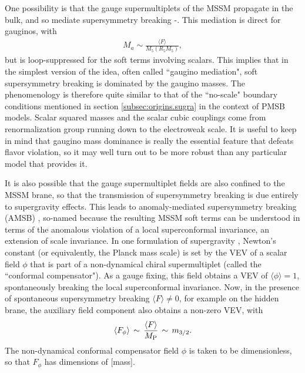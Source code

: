 \documentclass[11pt]{article}
\def\beq{\begin{eqnarray}}
\def\eeq{\end{eqnarray}}
\def\MPlanck{M_{\rm P}}
\begin{document}
One possibility is that the gauge supermultiplets of the MSSM propagate in 
the bulk, and so mediate supersymmetry breaking 
\cite{MirabelliPeskin}-\cite{deconstructedgauginomediation}. 
This mediation is direct for gauginos, with
\beq
M_a \sim \frac{\langle F \rangle}{M_5(R_5 M_5)} ,
\eeq
but is loop-suppressed for the soft terms involving
scalars. This implies that in the simplest 
version of the idea, often called ``gaugino mediation", soft supersymmetry 
breaking is dominated by the gaugino masses. The phenomenology is 
therefore quite similar to that of the ``no-scale" boundary conditions 
mentioned in section \ref{subsec:origins.sugra} in the context of PMSB 
models. Scalar squared masses and the scalar cubic couplings come from 
renormalization group running down to the electroweak scale.  It is useful 
to keep in mind that gaugino mass dominance is really the essential 
feature that defeats flavor violation, so it may well 
turn out to be more robust 
than any particular model that provides it.

It is also possible that the gauge supermultiplet fields are also confined 
to the MSSM brane, so that the transmission of supersymmetry breaking is 
due entirely to supergravity effects. This leads to
anomaly-mediated supersymmetry breaking (AMSB) \cite{AMSB}, so-named 
because the resulting MSSM soft terms can be understood in terms of the 
anomalous violation of a local superconformal invariance, an extension of 
scale invariance. In one formulation of supergravity 
\cite{superconformalsupergravity}, Newton's constant (or equivalently, the 
Planck mass scale) is set by the VEV of a scalar field $\phi$ that is part 
of a non-dynamical chiral supermultiplet (called the ``conformal 
compensator"). As a gauge fixing, this field obtains a VEV of $\langle 
\phi \rangle = 1$, spontaneously breaking the local superconformal 
invariance. Now, in the presence of spontaneous supersymmetry breaking 
$\langle F \rangle \not= 0$, for example on the hidden brane, the 
auxiliary field component also obtains a non-zero VEV, with
\beq
\langle F_\phi \rangle 
\,\sim\, 
\frac{\langle F \rangle}{\MPlanck} 
\,\sim\,
m_{3/2} .
\label{eq:AMSBgravitino}
\eeq
The non-dynamical conformal compensator field $\phi$ is taken to 
be dimensionless, so that $F_\phi$ has dimensions of [mass].
 
\end{document}
